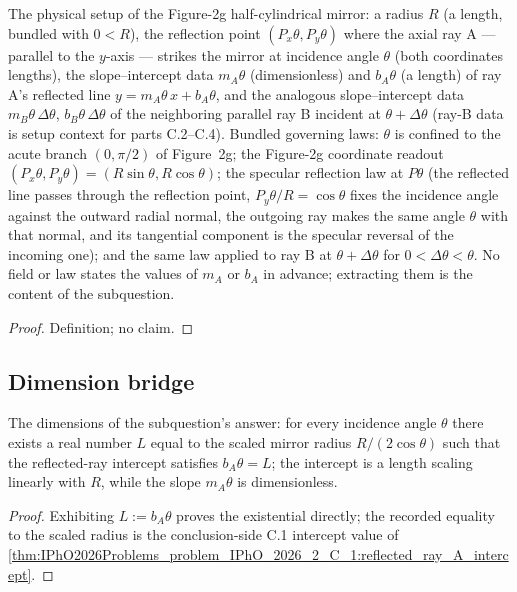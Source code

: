 \begin{definition}
\label{def:IPhO2026Problems_problem_IPhO_2026_2_C_1:HalfCylindricalMirrorReflection}
The physical setup of the Figure-2g half-cylindrical mirror: a radius
$R$ (a length, bundled with $0 < R$), the reflection point
$(P_x\theta, P_y\theta)$ where the axial ray A --- parallel to the
$y$-axis --- strikes the mirror at incidence angle $\theta$ (both
coordinates lengths), the slope--intercept data $m_A\theta$ (dimensionless)
and $b_A\theta$ (a length) of ray A's reflected line
$y = m_A\theta\,x + b_A\theta$, and the analogous slope--intercept data
$m_B\theta\,\Delta\theta$, $b_B\theta\,\Delta\theta$ of the neighboring
parallel ray B incident at $\theta + \Delta\theta$ (ray-B data is setup
context for parts C.2--C.4).  Bundled governing laws: $\theta$ is confined
to the acute branch $(0, \pi/2)$ of Figure~2g; the Figure-2g coordinate
readout $(P_x\theta, P_y\theta) = (R\sin\theta, R\cos\theta)$; the
specular reflection law at $P\theta$ (the reflected line passes through
the reflection point, $P_y\theta / R = \cos\theta$ fixes the incidence
angle against the outward radial normal, the outgoing ray makes the same
angle $\theta$ with that normal, and its tangential component is the
specular reversal of the incoming one); and the same law applied to ray B
at $\theta+\Delta\theta$ for $0 < \Delta\theta < \theta$.  No field or
law states the values of $m_A$ or $b_A$ in advance; extracting them is
the content of the subquestion.
\end{definition}
\begin{proof}
Definition; no claim.
\end{proof}

\subsection*{Dimension bridge}

\begin{lemma}
\label{lem:IPhO2026Problems_problem_IPhO_2026_2_C_1:intercept_is_length}
The dimensions of the subquestion's answer: for every incidence angle
$\theta$ there exists a real number $L$ equal to the scaled mirror radius
$R/(2\cos\theta)$ such that the reflected-ray intercept satisfies
$b_A\theta = L$; the intercept is a length scaling linearly with $R$,
while the slope $m_A\theta$ is dimensionless.
\end{lemma}
\begin{proof}
Exhibiting $L := b_A\theta$ proves the existential directly; the recorded
equality to the scaled radius is the conclusion-side C.1 intercept value
of \cref{thm:IPhO2026Problems_problem_IPhO_2026_2_C_1:reflected_ray_A_intercept}.
\end{proof}

